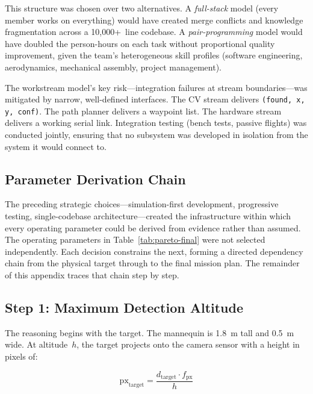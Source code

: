 This structure was chosen over two alternatives.
A \emph{full-stack} model (every member works on everything) would have created merge conflicts and knowledge fragmentation across a 10,000+~line codebase.
A \emph{pair-programming} model would have doubled the person-hours on each task without proportional quality improvement, given the team's heterogeneous skill profiles (software engineering, aerodynamics, mechanical assembly, project management).

The workstream model's key risk---integration failures at stream boundaries---was mitigated by narrow, well-defined interfaces.
The CV stream delivers \texttt{(found, x, y, conf)}.
The path planner delivers a waypoint list.
The hardware stream delivers a working serial link.
Integration testing (bench tests, passive flights) was conducted jointly, ensuring that no subsystem was developed in isolation from the system it would connect to.

\subsection{Parameter Derivation Chain}\label{sec:param-derivation-chain}

The preceding strategic choices---simulation-first development, progressive testing, single-codebase architecture---created the infrastructure within which every operating parameter could be derived from evidence rather than assumed.
The operating parameters in Table~\ref{tab:pareto-final} were not selected independently.
Each decision constrains the next, forming a directed dependency chain from the physical target through to the final mission plan.
The remainder of this appendix traces that chain step by step.

\subsection{Step 1: Maximum Detection Altitude}\label{sec:step-max-alt}

The reasoning begins with the target.
The mannequin is \SI{1.8}{\metre} tall and \SI{0.5}{\metre} wide.
At altitude~$h$, the target projects onto the camera sensor with a height in pixels of:

\begin{equation}\label{eq:target-px}
  \mathrm{px}_{\mathrm{target}} = \frac{d_{\mathrm{target}} \cdot f_{\mathrm{px}}}{h}
\end{equation}

